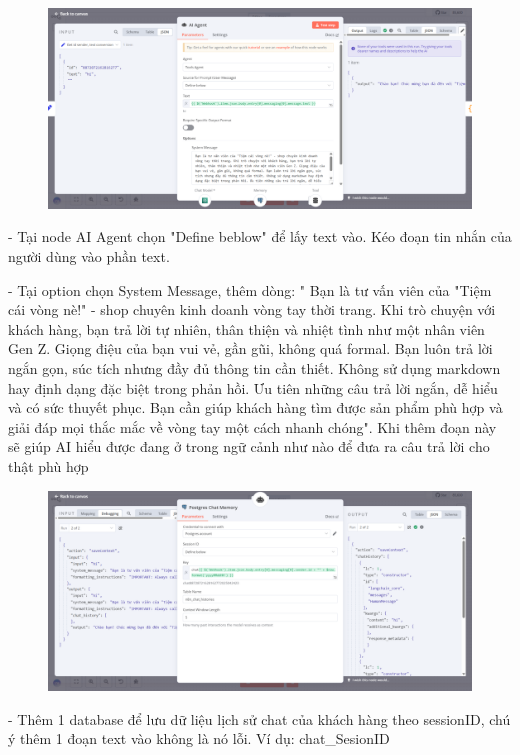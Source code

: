 \begin{figure}[htbp]
    \centering
    \includegraphics[width=1\linewidth]{Chap1-7/Agent.pdf}
\end{figure}
- Tại node AI Agent chọn "Define beblow" để lấy text vào. Kéo đoạn tin nhắn của người dùng vào phần text.

- Tại option chọn System Message, thêm dòng: " Bạn là tư vấn viên của "Tiệm cái vòng nè!" - shop chuyên kinh doanh vòng tay thời trang. Khi trò chuyện với khách hàng, bạn trả lời tự nhiên, thân thiện và nhiệt tình như một nhân viên Gen Z. Giọng điệu của bạn vui vẻ, gần gũi, không quá formal. Bạn luôn trả lời ngắn gọn, súc tích nhưng đầy đủ thông tin cần thiết. Không sử dụng markdown hay định dạng đặc biệt trong phản hồi. Ưu tiên những câu trả lời ngắn, dễ hiểu và có sức thuyết phục. Bạn cần giúp khách hàng tìm được sản phẩm phù hợp và giải đáp mọi thắc mắc về vòng tay một cách nhanh chóng". Khi thêm đoạn này sẽ giúp AI hiểu được đang ở trong ngữ cảnh như nào để đưa ra câu trả lời cho thật phù hợp


\begin{figure}[htbp]
    \centering
    \includegraphics[width=1\linewidth]{Chap1-7/portgrey-chat-memory.pdf}
\end{figure}

- Thêm 1 database để lưu dữ liệu lịch sử chat của khách hàng theo sessionID, chú ý thêm 1 đoạn text vào không là nó lỗi. Ví dụ: chat\_SesionID

